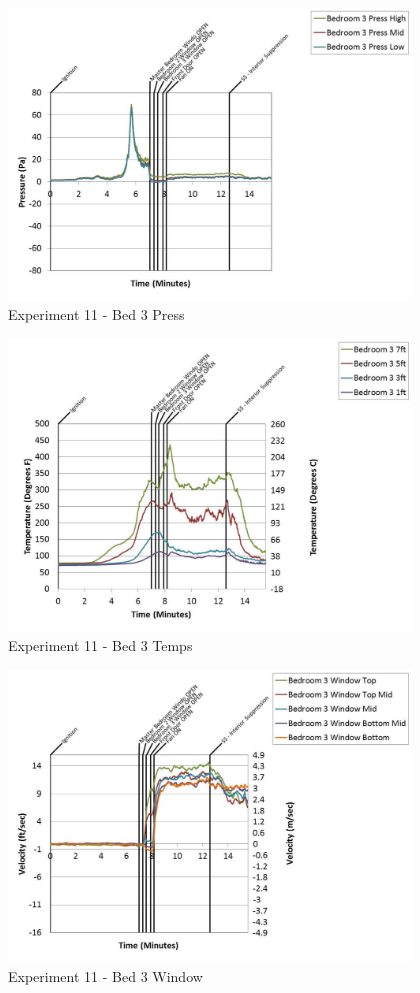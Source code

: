 \documentclass{article}
\begin{document}
\begin{appendices}
	\begin{figure}[h!]
		\centering
		\includegraphics[height=3.05in]{0_Images/Results_Charts/Exp_11_Charts/Bed3Press.pdf}
		\caption{Experiment 11 - Bed 3 Press}
	\end{figure}
 
	\clearpage

	\begin{figure}[h!]
		\centering
		\includegraphics[height=3.05in]{0_Images/Results_Charts/Exp_11_Charts/Bed3Temps.pdf}
		\caption{Experiment 11 - Bed 3 Temps}
	\end{figure}
 

	\begin{figure}[h!]
		\centering
		\includegraphics[height=3.05in]{0_Images/Results_Charts/Exp_11_Charts/Bed3Window.pdf}
		\caption{Experiment 11 - Bed 3 Window}
	\end{figure}
 

\end{appendices}
\end{document}
